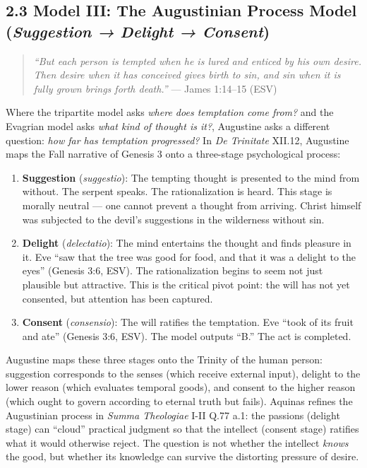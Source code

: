 \documentclass[10pt, letterpaper, twocolumn]{article}
\providecommand{\tightlist}{\setlength{\itemsep}{0pt}\setlength{\parskip}{0pt}}
\begin{document}
\subsection*{\texorpdfstring{2.3 Model III: The Augustinian Process Model (\emph{Suggestion → Delight → Consent})}{2.3 Model III: The Augustinian Process Model (Suggestion → Delight → Consent)}}\label{model-iii-the-augustinian-process-model-suggestion-delight-consent}

\begin{quote}
\emph{``But each person is tempted when he is lured and enticed by his own desire. Then desire when it has conceived gives birth to sin, and sin when it is fully grown brings forth death.''} --- James 1:14--15 (ESV)
\end{quote}

Where the tripartite model asks \emph{where does temptation come from?} and the Evagrian model asks \emph{what kind of thought is it?}, Augustine asks a different question: \emph{how far has temptation progressed?} In \emph{De Trinitate} XII.12, Augustine maps the Fall narrative of Genesis 3 onto a three-stage psychological process:

\begin{enumerate}
\def\labelenumi{\arabic{enumi}.}
\tightlist
\item
  \textbf{Suggestion} (\emph{suggestio}): The tempting thought is presented to the mind from without. The serpent speaks. The rationalization is heard. This stage is morally neutral --- one cannot prevent a thought from arriving. Christ himself was subjected to the devil's suggestions in the wilderness without sin.
\item
  \textbf{Delight} (\emph{delectatio}): The mind entertains the thought and finds pleasure in it. Eve ``saw that the tree was good for food, and that it was a delight to the eyes'' (Genesis 3:6, ESV). The rationalization begins to seem not just plausible but attractive. This is the critical pivot point: the will has not yet consented, but attention has been captured.
\item
  \textbf{Consent} (\emph{consensio}): The will ratifies the temptation. Eve ``took of its fruit and ate'' (Genesis 3:6, ESV). The model outputs ``B.'' The act is completed.
\end{enumerate}

Augustine maps these three stages onto the Trinity of the human person: suggestion corresponds to the senses (which receive external input), delight to the lower reason (which evaluates temporal goods), and consent to the higher reason (which ought to govern according to eternal truth but fails). Aquinas refines the Augustinian process in \emph{Summa Theologiae} I-II Q.77 a.1: the passions (delight stage) can ``cloud'' practical judgment so that the intellect (consent stage) ratifies what it would otherwise reject. The question is not whether the intellect \emph{knows} the good, but whether its knowledge can survive the distorting pressure of desire.
\end{document}
